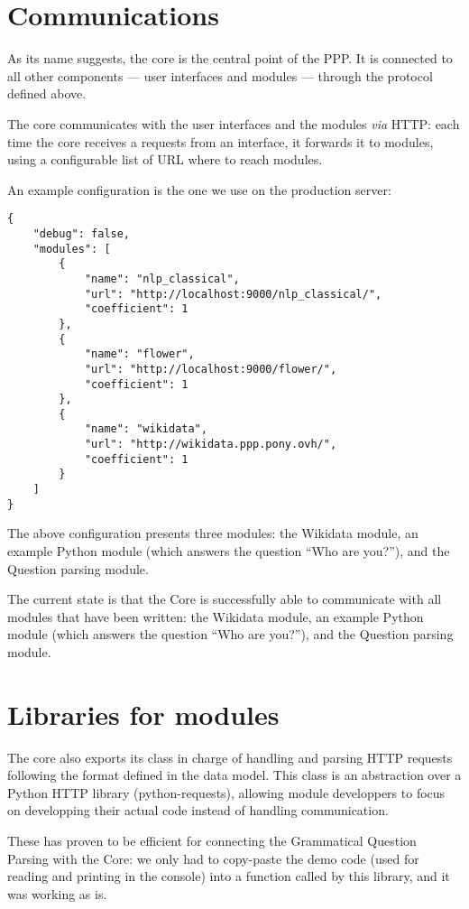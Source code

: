 \section{Communications}

As its name suggests, the core is the central point of the PPP. It is
connected to all other components — user interfaces and modules — through
the protocol defined above.

The core communicates with the user interfaces and the modules {\em via} HTTP:
each time the core receives a requests from an interface, it forwards it
to modules, using a configurable list of URL where to reach modules.

An example configuration is the one we use on the production server:

\begin{verbatim}
{
    "debug": false,
    "modules": [
        {
            "name": "nlp_classical",
            "url": "http://localhost:9000/nlp_classical/",
            "coefficient": 1
        },
        {
            "name": "flower",
            "url": "http://localhost:9000/flower/",
            "coefficient": 1
        },
        {
            "name": "wikidata",
            "url": "http://wikidata.ppp.pony.ovh/",
            "coefficient": 1
        }
    ]
}
\end{verbatim}

The above configuration presents three modules: the Wikidata module, an example 
Python module (which answers the question  “Who are you?”), and the Question parsing module.

The current state is that the Core is successfully able to
communicate with all modules
that have been written: the Wikidata module, an example Python module
(which answers the question  “Who are you?”), and the Question parsing module.

\section{Libraries for modules}

The core also exports its class in charge of handling and parsing HTTP
requests following the format defined in the data model.
This class is an abstraction over a Python HTTP library (python-requests),
allowing module developpers to focus on developping their actual code
instead of handling communication.

These has proven to be efficient for connecting the Grammatical Question Parsing
with the Core: we only had to copy-paste the demo code
(used for reading and printing in the console) into a function called
by this library, and it was working as is.


